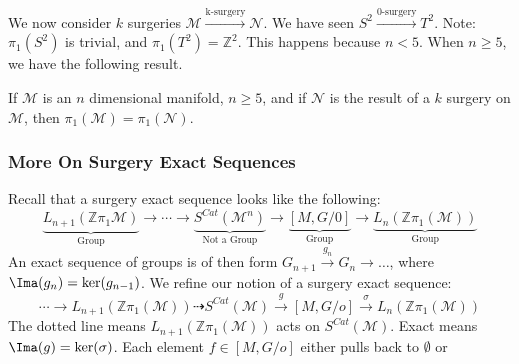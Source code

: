             We now consider $k$ surgeries
            $\mathcal{M}\overset{\textrm{k-surgery}}%
                                {\longrightarrow}\mathcal{N}$.
            We have seen
            $S^{2}\overset{\textrm{0-surgery}}{\longrightarrow}T^{2}$.
            Note: $\pi_{1}(S^{2})$ is trivial, and
            $\pi_{1}(T^{2})=\mathbb{Z}^{2}$. This happens because $n<5$. When
            $n\geq{5}$, we have the following result.
            \begin{theorem}
                If $\mathcal{M}$ is an $n$ dimensional manifold, $n\geq{5}$,
                and if $\mathcal{N}$ is the result of a $k$ surgery on
                $\mathcal{M}$, then $\pi_{1}(\mathcal{M})=\pi_{1}(\mathcal{N})$.
            \end{theorem}
        \subsubsection{More On Surgery Exact Sequences}
            Recall that a surgery exact sequence looks like the following:
            \begin{equation*}
                \underset{\textrm{Group}}
                {\underbrace{L_{n+1}(\mathbb{Z}\pi_{1}\mathcal{M})}}
                \rightarrow\cdots\rightarrow
                \underset{\textrm{Not a Group}}
                {\underbrace{S^{Cat}(\mathcal{M}^{n})}}
                \rightarrow
                \underset{\textrm{Group}}
                {\underbrace{[M,G/0]}}
                \rightarrow \underset{\textrm{Group}}
                {\underbrace{L_{n}(\mathbb{Z}\pi_{1}(\mathcal{M}))}} 
            \end{equation*}
            An exact sequence of groups is of then form
            $G_{n+1}\overset{g_{n}}{\rightarrow}%
             G_{n}\rightarrow \hdots$,
            where $\Ima(g_n)=\ker(g_{n-1})$. We refine our notion of a
            surgery exact sequence:
            \begin{equation*}
                \cdots\rightarrow
                L_{n+1}(\mathbb{Z}\pi_{1}(\mathcal{M}))
                \dashrightarrow{S^{Cat}}(\mathcal{M})
                \overset{g}{\rightarrow}[M,G/o]
                \overset{\sigma}{\rightarrow}
                L_{n}(\mathbb{Z}\pi_{1}(\mathcal{M}))
            \end{equation*}
            The dotted line means
            $L_{n+1}(\mathbb{Z}\pi_{1}(\mathcal{M}))$
            acts on $S^{Cat}(\mathcal{M})$. Exact means $\Ima(g)=\ker(\sigma)$.
            Each element $f\in{[M,G/o]}$ either pulls back to $\emptyset$ or
